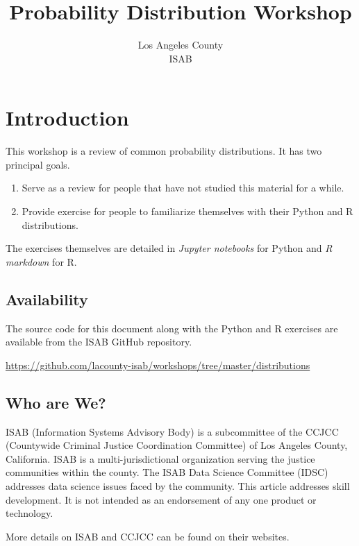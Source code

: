 \documentclass[]{article}
\title{Probability Distribution Workshop}
\author{Los Angeles County\\ISAB}
\begin{document}
\maketitle

\section{Introduction}

This workshop is a review of common probability distributions.
It has two principal goals.

\begin{enumerate}

\item Serve as a review for people that have not studied this material
   for a while.

\item Provide exercise for people to familiarize themselves with their
   Python and R distributions.

\end{enumerate}

The exercises themselves are detailed in \emph{Jupyter notebooks} for 
Python and \emph{R markdown} for R.  

\subsection{Availability}

The source code for this document
along with the Python and R exercises are available from the ISAB
GitHub repository.

\href{https://github.com/lacounty-isab/workshops/tree/master/distributions}{https://github.com/lacounty-isab/workshops/tree/master/distributions}

\subsection{Who are We?}

ISAB (Information Systems Advisory Body) is a subcommittee of the 
CCJCC (Countywide Criminal Justice Coordination Committee)
of Los Angeles County, California.
ISAB is a multi-jurisdictional organization serving the justice
communities within the county. 
The ISAB Data Science Committee (IDSC) addresses data science issues
faced by the community. This article addresses skill development.
It is not intended as an endorsement of any one product
or technology.

More details on ISAB and CCJCC can be found on their websites.
\end{document}
